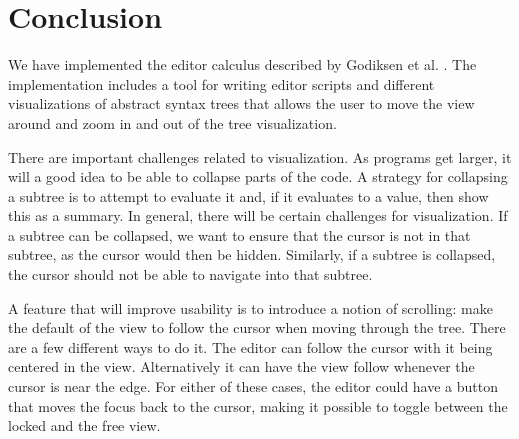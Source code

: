 \section{Conclusion}
\label{conclusion}

We have implemented the editor calculus described by Godiksen et
al. \pepm. The implementation includes a tool for writing editor
scripts and different visualizations of abstract syntax trees that
allows the user to move the view around and zoom in and out of the
tree visualization.

There are important challenges related to visualization. As programs
get larger, it will a good idea to be able to collapse parts of the
code. A strategy for collapsing a subtree is to attempt to evaluate it
and, if it evaluates to a value, then show this as a summary.  In
general, there will be certain challenges for visualization. If a
subtree can be collapsed, we want to ensure that the cursor is not in
that subtree, as the cursor would then be hidden. Similarly, if a
subtree is collapsed, the cursor should not be able to navigate into
that subtree.

A feature that will improve usability is to introduce a notion of
scrolling: make the default of the view to follow the cursor when
moving through the tree. There are a few different ways to do it. The
editor can follow the cursor with it being centered in the
view. Alternatively it can have the view follow whenever the cursor is
near the edge. For either of these cases, the editor could have a
button that moves the focus back to the cursor, making it possible to
toggle between the locked and the free view.

